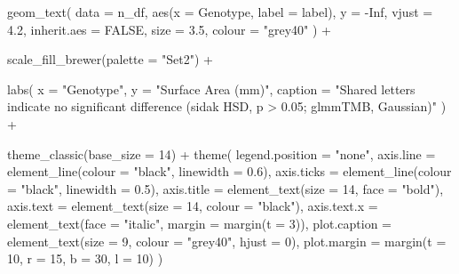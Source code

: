 \documentclass[
  letterpaper,
  DIV=11,
  numbers=noendperiod]{scrartcl}
\newenvironment{Shaded}{\begin{snugshade}}{\end{snugshade}}
\newcommand{\AttributeTok}[1]{\textcolor[rgb]{0.40,0.45,0.13}{#1}}
\newcommand{\ConstantTok}[1]{\textcolor[rgb]{0.56,0.35,0.01}{#1}}
\newcommand{\DecValTok}[1]{\textcolor[rgb]{0.68,0.00,0.00}{#1}}
\newcommand{\FloatTok}[1]{\textcolor[rgb]{0.68,0.00,0.00}{#1}}
\newcommand{\FunctionTok}[1]{\textcolor[rgb]{0.28,0.35,0.67}{#1}}
\newcommand{\NormalTok}[1]{\textcolor[rgb]{0.00,0.23,0.31}{#1}}
\newcommand{\SpecialCharTok}[1]{\textcolor[rgb]{0.37,0.37,0.37}{#1}}
\newcommand{\StringTok}[1]{\textcolor[rgb]{0.13,0.47,0.30}{#1}}
\newcounter{none} %
\begin{document}
\begin{Shaded}
\begin{Highlighting}[]
  \FunctionTok{geom\_text}\NormalTok{(}
    \AttributeTok{data        =}\NormalTok{ n\_df,}
    \FunctionTok{aes}\NormalTok{(}\AttributeTok{x =}\NormalTok{ Genotype, }\AttributeTok{label =}\NormalTok{ label),}
    \AttributeTok{y           =} \SpecialCharTok{{-}}\ConstantTok{Inf}\NormalTok{,}
    \AttributeTok{vjust       =} \FloatTok{4.2}\NormalTok{,}
    \AttributeTok{inherit.aes =} \ConstantTok{FALSE}\NormalTok{,}
    \AttributeTok{size        =} \FloatTok{3.5}\NormalTok{,}
    \AttributeTok{colour      =} \StringTok{"grey40"}
\NormalTok{  ) }\SpecialCharTok{+}

  \FunctionTok{scale\_fill\_brewer}\NormalTok{(}\AttributeTok{palette =} \StringTok{"Set2"}\NormalTok{) }\SpecialCharTok{+}

  \FunctionTok{labs}\NormalTok{(}
    \AttributeTok{x       =} \StringTok{"Genotype"}\NormalTok{,}
    \AttributeTok{y       =} \StringTok{"Surface Area (mm)"}\NormalTok{,}
    \AttributeTok{caption =} \StringTok{"Shared letters indicate no significant difference (sidak HSD, p \textgreater{} 0.05; glmmTMB, Gaussian)"}
\NormalTok{  ) }\SpecialCharTok{+}

  \FunctionTok{theme\_classic}\NormalTok{(}\AttributeTok{base\_size =} \DecValTok{14}\NormalTok{) }\SpecialCharTok{+}
  \FunctionTok{theme}\NormalTok{(}
    \AttributeTok{legend.position =} \StringTok{"none"}\NormalTok{,}
    \AttributeTok{axis.line       =} \FunctionTok{element\_line}\NormalTok{(}\AttributeTok{colour =} \StringTok{"black"}\NormalTok{, }\AttributeTok{linewidth =} \FloatTok{0.6}\NormalTok{),}
    \AttributeTok{axis.ticks      =} \FunctionTok{element\_line}\NormalTok{(}\AttributeTok{colour =} \StringTok{"black"}\NormalTok{, }\AttributeTok{linewidth =} \FloatTok{0.5}\NormalTok{),}
    \AttributeTok{axis.title      =} \FunctionTok{element\_text}\NormalTok{(}\AttributeTok{size =} \DecValTok{14}\NormalTok{, }\AttributeTok{face =} \StringTok{"bold"}\NormalTok{),}
    \AttributeTok{axis.text       =} \FunctionTok{element\_text}\NormalTok{(}\AttributeTok{size =} \DecValTok{14}\NormalTok{, }\AttributeTok{colour =} \StringTok{"black"}\NormalTok{),}
    \AttributeTok{axis.text.x     =} \FunctionTok{element\_text}\NormalTok{(}\AttributeTok{face =} \StringTok{"italic"}\NormalTok{, }\AttributeTok{margin =} \FunctionTok{margin}\NormalTok{(}\AttributeTok{t =} \DecValTok{3}\NormalTok{)),}
    \AttributeTok{plot.caption    =} \FunctionTok{element\_text}\NormalTok{(}\AttributeTok{size =} \DecValTok{9}\NormalTok{, }\AttributeTok{colour =} \StringTok{"grey40"}\NormalTok{, }\AttributeTok{hjust =} \DecValTok{0}\NormalTok{),}
    \AttributeTok{plot.margin     =} \FunctionTok{margin}\NormalTok{(}\AttributeTok{t =} \DecValTok{10}\NormalTok{, }\AttributeTok{r =} \DecValTok{15}\NormalTok{, }\AttributeTok{b =} \DecValTok{30}\NormalTok{, }\AttributeTok{l =} \DecValTok{10}\NormalTok{)}
\NormalTok{  )}


\end{Highlighting}
\end{Shaded}
\end{document}
